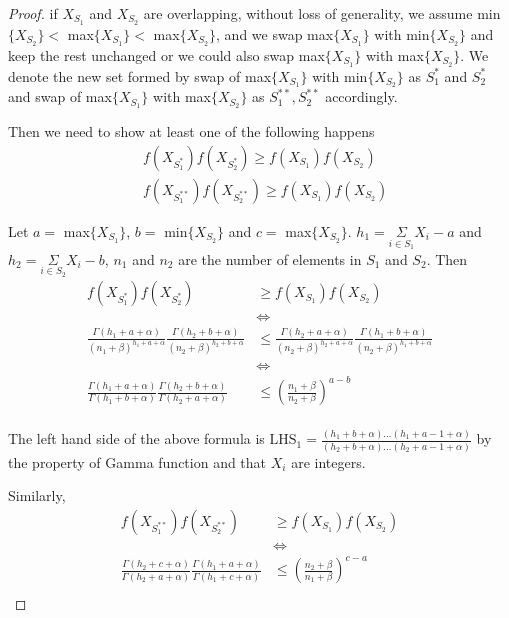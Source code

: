 \documentclass[aoas,preprint]{imsart}
\begin{document}
\begin{proof}
if $X_{S_1}$ and $X_{S_2}$ are overlapping, without loss of generality, we assume min$\{X_{S_2}\}  <$ max$\{X_{S_1}\}  <$ max$\{X_{S_2}\}$, and we swap max$\{X_{S_1}\}$ with min$\{X_{S_2}\}$ and keep the rest unchanged or we could also swap max$\{X_{S_1}\}$ with max$\{X_{S_2}\}$. We denote the new set formed 
by swap of max$\{X_{S_1}\}$ with min$\{X_{S_2}\}$  as $S_1^*$ and $S_2^*$ and swap of max$\{X_{S_1}\}$ with max$\{X_{S_2}\}$ as $S_1^{**}, S_2^{**}$ accordingly.

Then we need to show  at least one of the following happens
\begin{align}
&f(X_{S_1^*}) f(X_{S_2^*}) \geq f(X_{S_1}) f(X_{S_2})\\
&f(X_{S_1^{**}}) f(X_{S_2^{**}}) \geq f(X_{S_1}) f(X_{S_2})
\end{align}


Let $a =$ max$\{X_{S_1}\}$, $b = $ min$\{X_{S_2}\}$ and $c = $ max$\{X_{S_2}\}$. $h_1 = \underset{i \in S_1}{\Sigma} X_i - a$ and $h_2 = \underset{i \in S_2}{\Sigma} X_i - b$, $n_1$ and $n_2$ are the number of elements in $S_1$ and $S_2$. Then
\begin{align*}
f(X_{S_1^*}) f(X_{S_2^*}) &\geq f(X_{S_1}) f(X_{S_2})\\
&\iff\\
\frac{\Gamma(h_1 + a + \alpha)}{(n_1 + \beta)^{h_1 + a +\alpha}} \frac{\Gamma(h_2 + b + \alpha)}{(n_2 + \beta)^{h_2 + b + \alpha}} &\leq \frac{\Gamma(h_2 + a + \alpha)}{(n_2 + \beta)^{h_2+ a +\alpha}} \frac{\Gamma(h_1 + b + \alpha)}{(n_2 + \beta)^{h_1 + b + \alpha}}\\
&\iff\\
\frac{\Gamma(h_1 + a + \alpha)}{\Gamma(h_1 + b + \alpha)} \frac{\Gamma(h_2 + b + \alpha)}{\Gamma(h_2 + a + \alpha)} &\leq (\frac{n_1 + \beta}{n_2 + \beta})^{a - b} \\
\end{align*}

The left hand side of the above formula is $\text{LHS}_1 = \frac{(h_1 + b + \alpha)...(h_1 + a - 1 + \alpha)}{(h_2 + b + \alpha) ... (h_2 + a - 1 + \alpha)}$ by the property of Gamma function and that 
 $X_i$ are integers.

Similarly,
\begin{align*}
f(X_{S_1^{**}}) f(X_{S_2^{**}}) &\geq f(X_{S_1}) f(X_{S_2})\\
&\iff\\
\frac{\Gamma(h_2 + c + \alpha)}{\Gamma(h_2 + a + \alpha)} \frac{\Gamma(h_1 + a + \alpha)}{\Gamma(h_1 + c + \alpha)} &\leq (\frac{n_2 + \beta}{n_1 + \beta})^{c - a} \\
\end{align*}


\end{proof}
\end{document}

